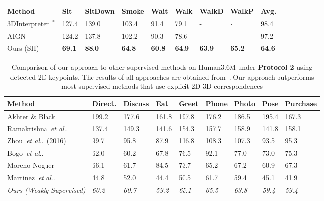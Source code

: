 \documentclass[runningheads]{llncs}
\makeatletter
\newcommand{\ouremph}[1]{{\textit{#1}}}
\DeclareRobustCommand\onedot{\futurelet\@let@token\@onedot}
\def\@onedot{\ifx\@let@token.\else.\null\fi\xspace}
\def\etal{\emph{et al}\onedot}
\makeatother
\begin{document}
\begin{table*}[t]
\begin{tabularx}{\textwidth}{ l *{8}{Y} }
		\bottomrule
		\toprule	
		Method & Sit & SitDown & Smoke & Wait & Walk & WalkD & WalkP & Avg.\\
		\midrule
		3DInterpreter~\cite{InterpreterNetwork2016}$^{\ast}$&127.4 & 139.0 & 103.4 & 91.4 &  79.1 & - & - &  98.4 \\
		AIGN~\cite{Tung_2017_ICCV} & 124.2 & { 137.8} & 102.2 & 90.3 & 78.6  &  - & - &  97.2\\
		Ours (SH) & {\bf 69.1}&	\textbf{88.0}& \textbf{64.8} &	{\bf 60.8} & 	\textbf{64.9} &	\textbf{63.9}	& \textbf{65.2} &	{\bf 64.6}\\
		\bottomrule
	\end{tabularx}
\end{table*}\begin{table}[t]
\caption{Comparison of our approach to other supervised methods on Human3.6M under \textbf{Protocol 2} using detected 2D keypoints. The results of all approaches are obtained from~\cite{MartinezICCV2017}. Our approach outperforms most supervised methods that use explicit 2D-3D correspondences}
\label{table:P2_sh_supervisedcomparison}
	\centering
	\begin{tabularx}{\textwidth}{ l *{8}{Y} }
		
		\toprule
		Method & Direct. & Discuss & Eat & Greet & Phone & Photo & Pose & Purchase \\
		\midrule
		Akhter \& Black~\cite{akhter2015pose} & 199.2 & 177.6 & 161.8 & 197.8 & 176.2 & 186.5 & 195.4 & 167.3 \\
		Ramakrishna~\etal~\cite{ramakrishna2012reconstructing} & 137.4 & 149.3 & 141.6 & 154.3 & 157.7 & 158.9 & 141.8 & 158.1 \\
		Zhou~\etal~(2016)\cite{Zhou_2016_CVPR} & 99.7 & 95.8 & 87.9 & 116.8 & 108.3 & 107.3 & 93.5 & 95.3\\
		Bogo~\etal~\cite{keep-it-simpl} & 62.0 & 60.2 & 67.8 & 76.5 & 92.1 & 77.0 & 73.0 & 75.3 \\
		Moreno-Noguer~\cite{Moreno-Noguer_2017_CVPR} & 66.1 & 61.7 & 84.5 & 73.7 & 65.2 & 67.2 & 60.9 & 67.3\\
		Martinez~\etal~\cite{MartinezICCV2017} & {44.8} & {52.0} & {44.4} & {50.5} &	{61.7} & {59.4} & {45.1} & {41.9} \\
		\midrule
		\ouremph{Ours (\textit{Weakly Supervised})} & \ouremph{60.2}&	\ouremph{60.7}&	\ouremph{59.2}&	\ouremph{65.1}&	\ouremph{65.5}&	\ouremph{63.8}&	\ouremph{59.4}&	\ouremph{59.4} \\
		\bottomrule
		

\end{tabularx}
\end{table}
\end{document}
